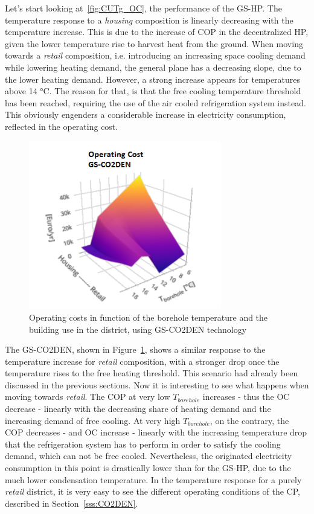 \documentclass{article}
\begin{document}
Let's start looking at~\ref{fig:CUTg_OC}, the performance of the GS-HP. The temperature response to a \textit{housing} composition is linearly decreasing with the temperature increase. This is due to the increase of COP in the decentralized HP, given the lower temperature rise to harvest heat from the ground. When moving towards a \textit{retail} composition, i.e. introducing an increasing space cooling demand while lowering heating demand, the general plane has a decreasing slope, due to the lower heating demand. However, a strong increase appears for temperatures above 14 \si{\celsius}. The reason for that, is that the free cooling temperature threshold has been reached, requiring the use of the air cooled refrigeration system instead. This obviously engenders a considerable increase in electricity consumption, reflected in the operating cost.

\begin{figure}[htp]
	\centering
	\includegraphics[width=0.75\textwidth]{CUTg_SA_CO2_OC.png}
	\caption{Operating costs in function of the borehole temperature and the building use in the district, using GS-CO2DEN technology}
	\label{fig:CUTg_CO2_OC}
\end{figure}

The GS-CO2DEN, shown in Figure~\ref{fig:CUTg_CO2_OC}, shows a similar response to the temperature increase for \textit{retail} composition, with a stronger drop once the temperature rises to the free heating threshold. This scenario had already been discussed in the previous sections. Now it is interesting to see what happens when moving towards \textit{retail}. The COP at very low $T_{borehole}$ increases - thus the OC decrease - linearly with the decreasing share of heating demand and the increasing demand of free cooling. At very high $T_{borehole}$, on the contrary, the COP decreases - and OC increase - linearly with the increasing temperature drop that the refrigeration system has to perform in order to satisfy the cooling demand, which can not be free cooled. Nevertheless, the originated electricity consumption in this point is drastically lower than for the GS-HP, due to the much lower condensation temperature. In the temperature response for a purely \textit{retail} district, it is very easy to see the different operating conditions of the CP, described in Section~\ref{sss:CO2DEN}. 
\end{document}
